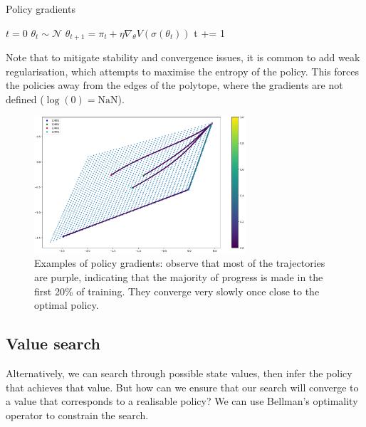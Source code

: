 \begin{algorithm}
\caption{Policy gradients}
\begin{algorithmic}[1]

  \State $t=0$
  \State $\theta_t \sim \mathcal N$ 
    \State $\theta_{t+1} = \pi_t + \eta \nabla_{\theta} V(\sigma(\theta_t))$ 
    \State t += 1
  \EndWhile
  \State {}
\EndProcedure

\end{algorithmic}
\end{algorithm}

Note that to mitigate stability and convergence issues, it is common to add weak regularisation,
which attempts to maximise the entropy of the policy. This forces the policies away
from the edges of the polytope, where the gradients are not defined ($\log(0) = \text{NaN}$).

\begin{figure}[h!]
\centering
\includegraphics[width=0.7\textwidth,height=0.35\textheight]{../../pictures/figures/pg-polytope.png}
\caption{Examples of policy gradients: observe that most of the trajectories are purple,
indicating that the majority of progress is made in the first 20\% of training.
They converge very slowly once close to the optimal policy.}
\end{figure}


\newpage

\subsection{Value search}

Alternatively, we can search through possible state values, then infer the policy that achieves that value.
But how can we ensure that our search will converge to a value that corresponds to a realisable policy? We can use Bellman's
optimality operator to constrain the search.


